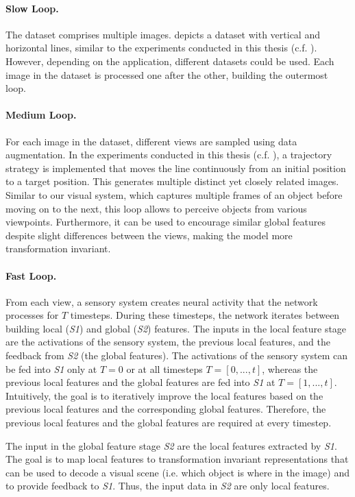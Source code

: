 \paragraph{Slow Loop.} The dataset comprises multiple images.  depicts a dataset with vertical and horizontal lines, similar to the experiments conducted in this thesis (c.f. ). However, depending on the application, different datasets could be used. Each image in the dataset is processed one after the other, building the outermost loop.

\paragraph{Medium Loop.} For each image in the dataset, different views are sampled using data augmentation. In the experiments conducted in this thesis (c.f. ), a trajectory strategy is implemented that moves the line continuously from an initial position to a target position. This generates multiple distinct yet closely related images. Similar to our visual system, which captures multiple frames of an object before moving on to the next, this loop allows to perceive objects from various viewpoints. Furthermore, it can be used to encourage similar global features despite slight differences between the views, making the model more transformation invariant.

\paragraph{Fast Loop.} From each view, a sensory system creates neural activity that the network processes for $T$ timesteps. During these timesteps, the network iterates between building local (\emph{S1}) and global (\emph{S2}) features. The inputs in the local feature stage are the activations of the sensory system, the previous local features, and the feedback from \emph{S2} (the global features).
The activations of the sensory system can be fed into \emph{S1} only at $T=0$ or at all timesteps $T=[0, ..., t]$, whereas the previous local features and the global features are fed into \emph{S1} at $T=[1, ..., t]$. Intuitively, the goal is to iteratively improve the local features based on the previous local features and the corresponding global features. Therefore, the previous local features and the global features are required at every timestep.

The input in the global feature stage \emph{S2} are the local features extracted by \emph{S1}. The goal is to map local features to transformation invariant representations that can be used to decode a visual scene (i.e. which object is where in the image) and to provide feedback to \emph{S1}. Thus, the input data in \emph{S2} are only local features.


